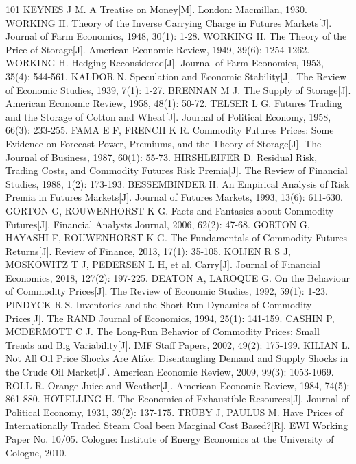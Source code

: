 \documentclass[12pt,a4paper]{ctexart}
\begin{document}
\begin{thebibliography}{101}
 KEYNES J M. A Treatise on Money[M]. London: Macmillan, 1930.
 WORKING H. Theory of the Inverse Carrying Charge in Futures Markets[J]. Journal of Farm Economics, 1948, 30(1): 1-28.
 WORKING H. The Theory of the Price of Storage[J]. American Economic Review, 1949, 39(6): 1254-1262.
 WORKING H. Hedging Reconsidered[J]. Journal of Farm Economics, 1953, 35(4): 544-561.
 KALDOR N. Speculation and Economic Stability[J]. The Review of Economic Studies, 1939, 7(1): 1-27.
 BRENNAN M J. The Supply of Storage[J]. American Economic Review, 1958, 48(1): 50-72.
 TELSER L G. Futures Trading and the Storage of Cotton and Wheat[J]. Journal of Political Economy, 1958, 66(3): 233-255.
 FAMA E F, FRENCH K R. Commodity Futures Prices: Some Evidence on Forecast Power, Premiums, and the Theory of Storage[J]. The Journal of Business, 1987, 60(1): 55-73.
 HIRSHLEIFER D. Residual Risk, Trading Costs, and Commodity Futures Risk Premia[J]. The Review of Financial Studies, 1988, 1(2): 173-193.
 BESSEMBINDER H. An Empirical Analysis of Risk Premia in Futures Markets[J]. Journal of Futures Markets, 1993, 13(6): 611-630.
 GORTON G, ROUWENHORST K G. Facts and Fantasies about Commodity Futures[J]. Financial Analysts Journal, 2006, 62(2): 47-68.
 GORTON G, HAYASHI F, ROUWENHORST K G. The Fundamentals of Commodity Futures Returns[J]. Review of Finance, 2013, 17(1): 35-105.
 KOIJEN R S J, MOSKOWITZ T J, PEDERSEN L H, et al. Carry[J]. Journal of Financial Economics, 2018, 127(2): 197-225.
 DEATON A, LAROQUE G. On the Behaviour of Commodity Prices[J]. The Review of Economic Studies, 1992, 59(1): 1-23.
 PINDYCK R S. Inventories and the Short-Run Dynamics of Commodity Prices[J]. The RAND Journal of Economics, 1994, 25(1): 141-159.
 CASHIN P, MCDERMOTT C J. The Long-Run Behavior of Commodity Prices: Small Trends and Big Variability[J]. IMF Staff Papers, 2002, 49(2): 175-199.
 KILIAN L. Not All Oil Price Shocks Are Alike: Disentangling Demand and Supply Shocks in the Crude Oil Market[J]. American Economic Review, 2009, 99(3): 1053-1069.
 ROLL R. Orange Juice and Weather[J]. American Economic Review, 1984, 74(5): 861-880.
 HOTELLING H. The Economics of Exhaustible Resources[J]. Journal of Political Economy, 1931, 39(2): 137-175.
 TRÜBY J, PAULUS M. Have Prices of Internationally Traded Steam Coal been Marginal Cost Based?[R]. EWI Working Paper No. 10/05. Cologne: Institute of Energy Economics at the University of Cologne, 2010.

\end{thebibliography}
\end{document}
